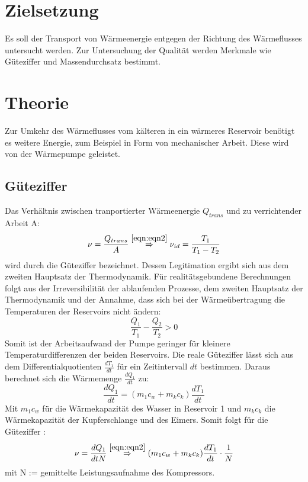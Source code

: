 \section{Zielsetzung}
\label{sec:Ziel}
Es soll der Transport von Wärmeenergie entgegen der Richtung des Wärmeflusses untersucht werden.
Zur Untersuchung der Qualität werden Merkmale wie Güteziffer und Massendurchsatz bestimmt.

\section{Theorie}
\label{sec:Theorie}
Zur Umkehr des Wärmeflusses vom kälteren in ein wärmeres Reservoir benötigt es weitere Energie, zum Beispiel in Form von mechanischer Arbeit.
Diese wird von der Wärmepumpe geleistet.

\subsection{Güteziffer}
\label{sec:Güteziffer}
Das Verhältnis zwischen tranportierter Wärmeenergie $Q_{trans}$ und zu verrichtender Arbeit A:
\begin{equation}
  \nu = \frac{Q_{trans}}{A} \stackrel{\ref{eqn:eqn2}}\Rightarrow \nu_{id} = \frac{T_1}{T_1-T_2}
  \label{eqn:eqn1}
\end{equation}
wird durch die Güteziffer \nu bezeichnet.
Dessen Legitimation ergibt sich aus dem zweiten Hauptsatz der Thermodynamik.
Für realitätsgebundene Berechnungen folgt aus der Irreversibilität der ablaufenden Prozesse, 
dem zweiten Hauptsatz der Thermodynamik und der Annahme, dass sich bei der Wärmeübertragung die Temperaturen der Reservoirs nicht ändern:
\begin{equation}
  \frac{Q_1}{T_1} - \frac{Q_2}{T_2} > 0
  \label{eqn:eqn2}
\end{equation}
Somit ist der Arbeitsaufwand der Pumpe geringer für kleinere Temperaturdifferenzen der beiden Reservoirs.
Die reale Güteziffer \nu lässt sich aus dem Differentialquotienten $\frac{dT_1}{dt}$ für ein Zeitintervall $dt$ bestimmen.
Daraus berechnet sich die Wärmemenge $\frac{dQ_1}{dt}$ zu:
\begin{equation}
  \frac{dQ_1}{dt} = (m_1c_w + m_kc_k) \frac{dT_1}{dt}
  \label{eqn:eqn3}
\end{equation}
Mit $m_1c_w$ für die Wärmekapazität des Wasser in Reservoir 1 und $m_kc_k$ die Wärmekapazität der Kupferschlange und des Eimers.
Somit folgt für die Güteziffer \nu :
\begin{equation}
  \nu = \frac{dQ_1}{dtN} \stackrel{\ref{eqn:eqn2}}\Rightarrow (m_1c_w + m_kc_k) \frac{dT_1}{dt} \cdot \frac{1}{N}
  \label{eqn:eqn4}
\end{equation}
mit N := gemittelte Leistungsaufnahme des Kompressors.

